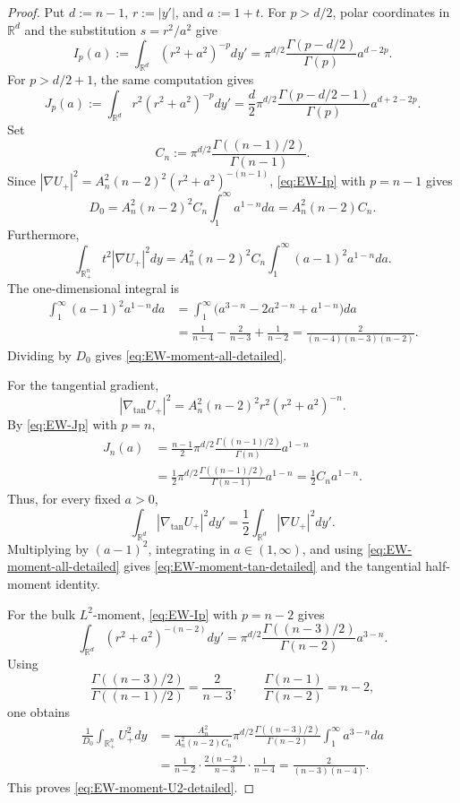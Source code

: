 \documentclass[11pt,reqno,a4paper]{amsart}
\newcommand{\R}{\mathbb{R}}
\numberwithin{equation}{section}
\theoremstyle{plain}
\theoremstyle{remark}
\theoremstyle{plain}
\begin{document}
\begin{proof}
Put $d:=n-1$, $r:=|y'|$, and $a:=1+t$.  For $p>d/2$, polar coordinates in
$\R^d$ and the substitution $s=r^2/a^2$ give
\begin{equation}\label{eq:EW-Ip}
I_p(a):=\int_{\R^d}(r^2+a^2)^{-p}dy'
=\pi^{d/2}\frac{\Gamma(p-d/2)}{\Gamma(p)}a^{d-2p}.
\end{equation}
For $p>d/2+1$, the same computation gives
\begin{equation}\label{eq:EW-Jp}
J_p(a):=\int_{\R^d}r^2(r^2+a^2)^{-p}dy'
=\frac d2\pi^{d/2}\frac{\Gamma(p-d/2-1)}{\Gamma(p)}a^{d+2-2p}.
\end{equation}
Set
\[
C_n:=\pi^{d/2}\frac{\Gamma((n-1)/2)}{\Gamma(n-1)}.
\]
Since $|\nabla U_+|^2=A_n^2(n-2)^2(r^2+a^2)^{-(n-1)}$,
\eqref{eq:EW-Ip} with $p=n-1$ gives
\[
D_0=A_n^2(n-2)^2C_n\int_1^\infty a^{1-n}da
=A_n^2(n-2)C_n.
\]
Furthermore,
\[
\int_{\R^n_+}t^2|\nabla U_+|^2dy
=A_n^2(n-2)^2C_n\int_1^\infty(a-1)^2a^{1-n}da.
\]
The one-dimensional integral is
\begin{align*}
\int_1^\infty(a-1)^2a^{1-n}da
&=\int_1^\infty\bigl(a^{3-n}-2a^{2-n}+a^{1-n}\bigr)da \\
&=\frac1{n-4}-\frac2{n-3}+\frac1{n-2}
=\frac{2}{(n-4)(n-3)(n-2)}.
\end{align*}
Dividing by $D_0$ gives \eqref{eq:EW-moment-all-detailed}.

For the tangential gradient,
\[
|\nabla_{\tan}U_+|^2=A_n^2(n-2)^2r^2(r^2+a^2)^{-n}.
\]
By \eqref{eq:EW-Jp} with $p=n$,
\begin{align*}
J_n(a)
&=\frac{n-1}{2}\pi^{d/2}\frac{\Gamma((n-1)/2)}{\Gamma(n)}a^{1-n}  \\
&=\frac12\pi^{d/2}\frac{\Gamma((n-1)/2)}{\Gamma(n-1)}a^{1-n}
=\frac12 C_na^{1-n}.
\end{align*}
Thus, for every fixed $a>0$,
\[
\int_{\R^d}|\nabla_{\tan}U_+|^2dy'
=\frac12\int_{\R^d}|\nabla U_+|^2dy'.
\]
Multiplying by $(a-1)^2$, integrating in $a\in(1,\infty)$, and using
\eqref{eq:EW-moment-all-detailed} gives \eqref{eq:EW-moment-tan-detailed} and the
tangential half-moment identity.

For the bulk $L^2$-moment, \eqref{eq:EW-Ip} with $p=n-2$ gives
\[
\int_{\R^d}(r^2+a^2)^{-(n-2)}dy'
=\pi^{d/2}\frac{\Gamma((n-3)/2)}{\Gamma(n-2)}a^{3-n}.
\]
Using
\[
\frac{\Gamma((n-3)/2)}{\Gamma((n-1)/2)}=\frac2{n-3},
\qquad
\frac{\Gamma(n-1)}{\Gamma(n-2)}=n-2,
\]
one obtains
\begin{align*}
\frac{1}{D_0}\int_{\R^n_+}U_+^2dy
&=\frac{A_n^2}{A_n^2(n-2)C_n}
\pi^{d/2}\frac{\Gamma((n-3)/2)}{\Gamma(n-2)}
\int_1^\infty a^{3-n}da \\
&=\frac{1}{n-2}\cdot\frac{2(n-2)}{n-3}\cdot\frac1{n-4}
=\frac{2}{(n-3)(n-4)}.
\end{align*}
This proves \eqref{eq:EW-moment-U2-detailed}.


\end{proof}
\end{document}
